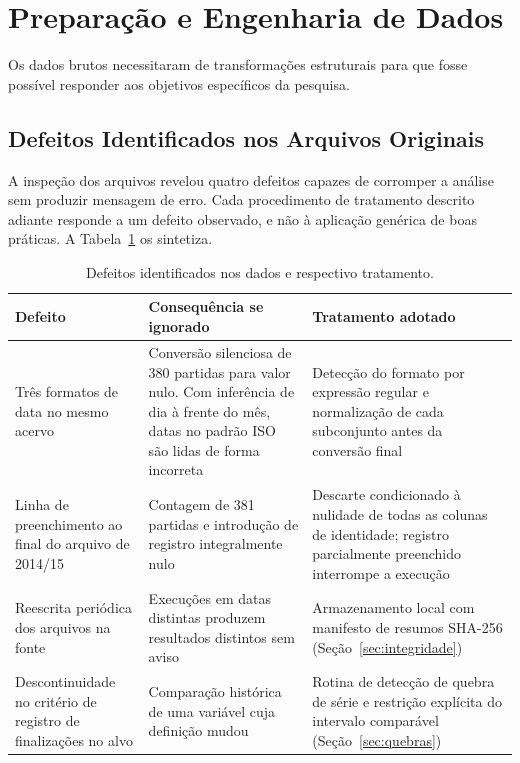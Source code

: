 \section{Preparação e Engenharia de Dados}\label{sec:preparacao}

Os dados brutos necessitaram de transformações estruturais para que fosse
possível responder aos objetivos específicos da pesquisa.

\subsection{Defeitos Identificados nos Arquivos Originais}\label{sec:defeitos}

A inspeção dos arquivos revelou quatro defeitos capazes de corromper a análise
sem produzir mensagem de erro. Cada procedimento de tratamento descrito adiante
responde a um defeito observado, e não à aplicação genérica de boas práticas. A
Tabela~\ref{tab:defeitos} os sintetiza.

\begin{table}[htb]
  \centering
  \caption{Defeitos identificados nos dados e respectivo tratamento.}
  \label{tab:defeitos}
  \small
  \begin{tabular}{@{}p{3.1cm}p{4.4cm}p{4.8cm}@{}}
    \toprule
    \textbf{Defeito} & \textbf{Consequência se ignorado} &
      \textbf{Tratamento adotado} \\
    \midrule
    Três formatos de data no mesmo acervo &
      Conversão silenciosa de 380 partidas para valor nulo. Com inferência de
      dia à frente do mês, datas no padrão ISO são lidas de forma incorreta &
      Detecção do formato por expressão regular e normalização de cada
      subconjunto antes da conversão final \\
    \addlinespace
    Linha de preenchimento ao final do arquivo de 2014/15 &
      Contagem de 381 partidas e introdução de registro integralmente nulo &
      Descarte condicionado à nulidade de todas as colunas de identidade;
      registro parcialmente preenchido interrompe a execução \\
    \addlinespace
    Reescrita periódica dos arquivos na fonte &
      Execuções em datas distintas produzem resultados distintos sem aviso &
      Armazenamento local com manifesto de resumos SHA-256
      (Seção~\ref{sec:integridade}) \\
    \addlinespace
    Descontinuidade no critério de registro de finalizações no alvo &
      Comparação histórica de uma variável cuja definição mudou &
      Rotina de detecção de quebra de série e restrição explícita do intervalo
      comparável (Seção~\ref{sec:quebras}) \\
    \bottomrule
  \end{tabular}
\end{table}

